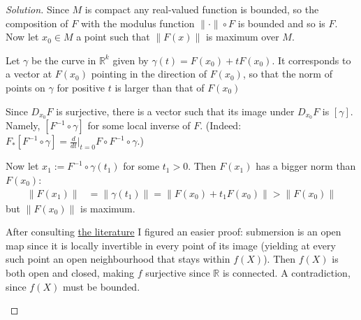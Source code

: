 \begin{proof}[Solution]\leavevmode
	Since \(M\) is compact any real-valued function is bounded, so the composition of \(F\) with the modulus function \(\|\cdot\| \circ F\) is bounded and so is \(F\). Now let \(x_0 \in M\) a point such that \(\|F(x)\|\) is maximum over \(M\).

Let \(\gamma\) be the curve in \(\mathbb{R}^k\) given by \(\gamma(t)=F(x_0)+tF(x_0)\). It corresponds to a vector at \(F(x_0)\) pointing in the direction of \(F(x_0)\), so that the norm of points on \(\gamma\) for positive \(t\) is larger than that of \(F(x_0)\)

Since \(D_{x_0}F\) is surjective, there is a vector such that its image under \(D_{x_0}F\) is \([\gamma]\). Namely, \([F^{-1}\circ \gamma]\) for some local inverse of \(F\). (Indeed: \(F_*[F^{-1}\circ \gamma]=\frac{d}{dt}\Big|_{t=0}F \circ F^{-1} \circ \gamma\).)

Now let \(x_1:=F^{-1} \circ \gamma(t_1)\) for some \(t_1>0\). Then \(F(x_1)\) has a bigger norm than \(F(x_0)\):
\begin{align*}
\|F(x_1)\|&=\|\gamma(t_1)\|=\|F(x_0)+t_1F(x_0)\|>\|F(x_0)\|
\end{align*}
but \(\|F(x_0)\|\) is maximum.

\begin{remark}\leavevmode
	After consulting \href{https://math.stackexchange.com/questions/470164/a-submersion-f-mathcalx-to-mathcaly-must-be-surjective}{the literature} I figured an easier proof:  submersion is an open map since it is locally invertible in every point of its image (yielding at every such point an open neighbourhood that stays within \(f(X)\)). Then \(f(X)\) is both open and closed, making \(f\) surjective since \(\mathbb{R}\) is connected. A contradiction, since \(f(X)\) must be bounded.
\end{remark}

\end{proof}






